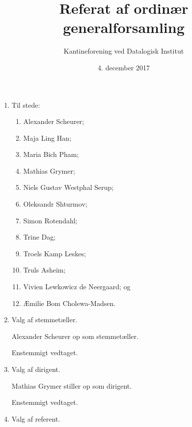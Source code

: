 \documentclass[a4paper]{article}
\title{Referat af ordinær generalforsamling}
\author{Kantineforening ved Datalogisk Institut}
\date{4. december 2017}
\begin{document}
\maketitle

\thispagestyle{fancy}


\begin{enumerate}

\item[\textsection 1] Til stede:

\begin{enumerate}

\item Alexander Scheurer;

\item Maja Ling Han;

\item Maria Bich Pham;

\item Mathias Grymer;

\item Niels Gustav Westphal Serup;

\item Oleksandr Shturmov;

\item Simon Rotendahl;

\item Trine Dag;

\item Troels Kamp Leskes;

\item Truls Asheim;

\item Vivien Lewkowicz de Neergaard; og

\item Æmilie Bom Cholewa-Madsen.

\end{enumerate}


\item[\textsection 2] Valg af stemmetæller.

Alexander Scheurer op som stemmetæller.

Enstemmigt vedtaget.


\item[\textsection 3] Valg af dirigent.

Mathias Grymer stiller op som dirigent.

Enstemmigt vedtaget.


\item[\textsection 4] Valg af referent.


\end{enumerate}
\end{document}
